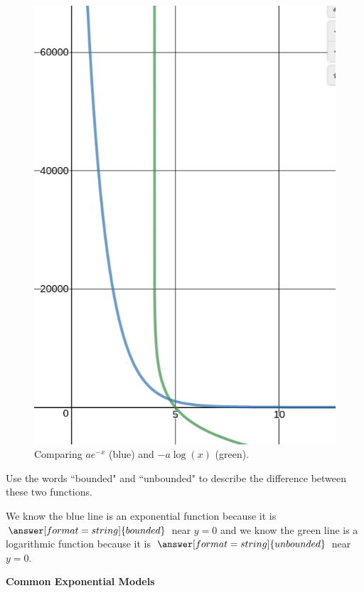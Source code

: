\documentclass{ximera}
\begin{document}
\begin{figure}
	\includegraphics[scale=0.3]{comparison.png}
	\caption{Comparing $ae^{-x}$ (blue) and $-a\log(x)$ (green).}
\end{figure}

\begin{question}
	Use the words ``bounded" and ``unbounded" to describe the difference between these two functions.
	
	We know the blue line is an exponential function because it is $\answer[format=string]{bounded}$ near $y=0$ and we know the green line is a logarithmic function because it is $\answer[format=string]{unbounded}$ near $y=0$. 
\end{question}

\begin{center} \textbf{\Large Common Exponential Models} \end{center}
\end{document}
